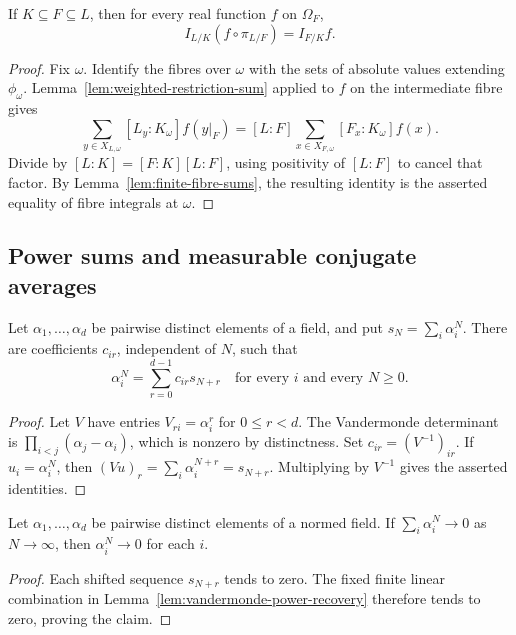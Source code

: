 \begin{proposition}\label{prop:fibre-restriction}
\leanok
{}
If $K\subseteq F\subseteq L$, then for every real function $f$ on
$\Omega_F$,
\[
 I_{L/K}(f\circ\pi_{L/F})=I_{F/K}f.
\]
\end{proposition}
\begin{proof}
Fix $\omega$. Identify the fibres over $\omega$ with the sets of
absolute values extending $\phi_\omega$. Lemma~\ref{lem:weighted-restriction-sum}
applied to $f$ on the intermediate fibre gives
\[
 \sum_{y\in X_{L,\omega}}[L_y:K_\omega]f(y|_F)
 =[L:F]\sum_{x\in X_{F,\omega}}[F_x:K_\omega]f(x).
\]
Divide by $[L:K]=[F:K][L:F]$, using positivity of $[L:F]$ to cancel
that factor. By Lemma~\ref{lem:finite-fibre-sums}, the resulting
identity is the asserted equality of fibre integrals at $\omega$.
\end{proof}

\subsection{Power sums and measurable conjugate averages}

\begin{lemma}
\label{lem:vandermonde-power-recovery}
\leanok
{}
Let $\alpha_1,\ldots,\alpha_d$ be pairwise distinct elements of a field,
and put $s_N=\sum_i\alpha_i^N$. There are coefficients $c_{ir}$,
independent of $N$, such that
\[
 \alpha_i^N=\sum_{r=0}^{d-1}c_{ir}s_{N+r}
 \quad\text{for every }i\text{ and every }N\geq0.
\]
\end{lemma}
\begin{proof}
Let $V$ have entries $V_{ri}=\alpha_i^r$ for $0\leq r<d$.
The Vandermonde determinant is
$\prod_{i<j}(\alpha_j-\alpha_i)$, which is nonzero by distinctness.
Set $c_{ir}=(V^{-1})_{ir}$. If $u_i=\alpha_i^N$, then
$(Vu)_r=\sum_i\alpha_i^{N+r}=s_{N+r}$. Multiplying by $V^{-1}$
gives the asserted identities.
\end{proof}

\begin{lemma}
\label{lem:power-sum-decay}
\leanok
{}
Let $\alpha_1,\ldots,\alpha_d$ be pairwise distinct elements of a
normed field. If $\sum_i\alpha_i^N\to0$ as $N\to\infty$, then
$\alpha_i^N\to0$ for each $i$.
\end{lemma}
\begin{proof}
Each shifted sequence $s_{N+r}$ tends to zero. The fixed finite linear
combination in Lemma~\ref{lem:vandermonde-power-recovery} therefore
tends to zero, proving the claim.
\end{proof}

